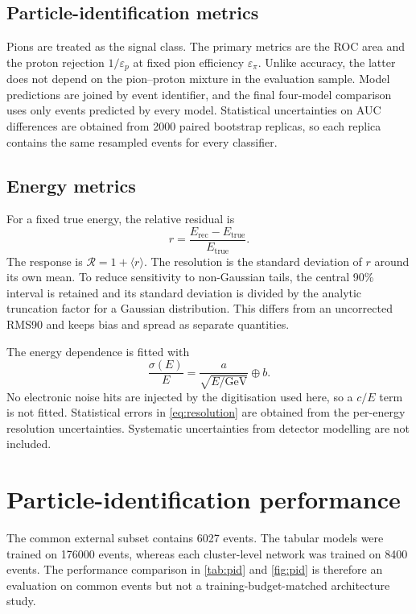 \documentclass[11pt,a4paper]{article}
\newcommand{\Etrue}{\ensuremath{E_{\mathrm{true}}}}
\newcommand{\Erec}{\ensuremath{E_{\mathrm{rec}}}}
\newcommand{\GeV}{\ensuremath{\mathrm{GeV}}}
\begin{document}
\subsection{Particle-identification metrics}

Pions are treated as the signal class. The primary metrics are the ROC area and the
proton rejection $1/\varepsilon_p$ at fixed pion efficiency $\varepsilon_\pi$.
Unlike accuracy, the latter does not depend on the pion--proton mixture in the
evaluation sample. Model predictions are joined by event identifier, and the final
four-model comparison uses only events predicted by every model. Statistical
uncertainties on AUC differences are obtained from 2000 paired bootstrap replicas,
so each replica contains the same resampled events for every classifier.

\subsection{Energy metrics}

For a fixed true energy, the relative residual is
\begin{equation}
  r = \frac{\Erec-\Etrue}{\Etrue}.
\end{equation}
The response is $\mathcal{R}=1+\langle r\rangle$. The resolution is the standard
deviation of $r$ around its own mean. To reduce sensitivity to non-Gaussian tails,
the central 90\% interval is retained and its standard deviation is divided by the
analytic truncation factor for a Gaussian distribution. This differs from an
uncorrected RMS90 and keeps bias and spread as separate quantities.

The energy dependence is fitted with
\begin{equation}
  \frac{\sigma(E)}{E} = \frac{a}{\sqrt{E/\GeV}}\oplus b.
  \label{eq:resolution}
\end{equation}
No electronic noise hits are injected by the digitisation used here, so a $c/E$ term
is not fitted. Statistical errors in \cref{eq:resolution} are obtained from the
per-energy resolution uncertainties. Systematic uncertainties from detector modelling
are not included.

\section{Particle-identification performance}
\label{sec:pid-results}

The common external subset contains 6027 events. The tabular models were trained on
176000 events, whereas each cluster-level network was trained on 8400 events. The
performance comparison in \cref{tab:pid} and \cref{fig:pid} is therefore an evaluation
on common events but not a training-budget-matched architecture study.
\end{document}
